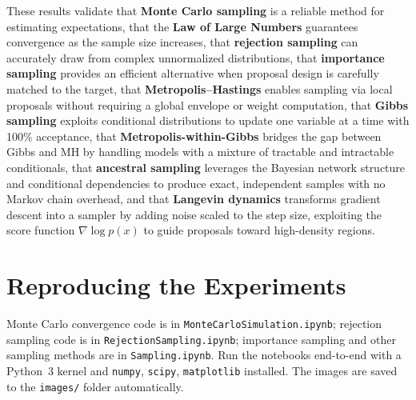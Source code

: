 \documentclass[12pt, a4paper]{article}
\begin{document}
These results validate that \textbf{Monte Carlo sampling} is a reliable
method for estimating expectations, that the \textbf{Law of Large
Numbers} guarantees convergence as the sample size increases,
that \textbf{rejection sampling} can accurately draw from complex
unnormalized distributions, that \textbf{importance sampling}
provides an efficient alternative when proposal design is carefully
matched to the target, that \textbf{Metropolis--Hastings} enables
sampling via local proposals without requiring a global envelope or
weight computation, that \textbf{Gibbs sampling} exploits
conditional distributions to update one variable at a time with
100\% acceptance, that \textbf{Metropolis-within-Gibbs}
bridges the gap between Gibbs and MH by handling models with
a mixture of tractable and intractable conditionals,
that \textbf{ancestral sampling} leverages the Bayesian network
structure and conditional dependencies to produce exact,
independent samples with no Markov chain overhead, and that
\textbf{Langevin dynamics} transforms gradient descent into a
sampler by adding noise scaled to the step size, exploiting the
score function $\nabla \log p(x)$ to guide proposals toward
high-density regions.

\section*{Reproducing the Experiments}

Monte Carlo convergence code is in
\texttt{MonteCarloSimulation.ipynb}; rejection sampling code is in
\texttt{RejectionSampling.ipynb}; importance sampling and other
sampling methods are in \texttt{Sampling.ipynb}.  Run the notebooks
end-to-end with a Python~3 kernel and \texttt{numpy}, \texttt{scipy},
\texttt{matplotlib} installed.
The images are saved to the \texttt{images/} folder automatically.
\end{document}
